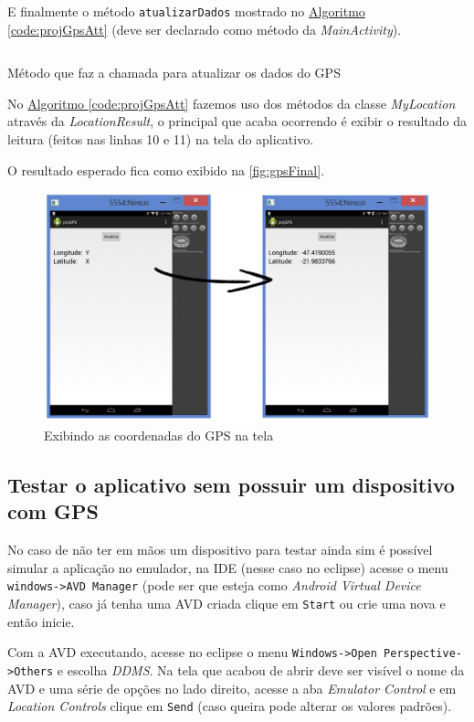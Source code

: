 \documentclass[a4paper,12pt,brazil,oneside]{book}
\begin{document}
		E finalmente o método \texttt{atualizarDados} mostrado no \hyperref[code:projGpsAtt]{Algoritmo \ref*{code:projGpsAtt}} (deve ser declarado como método da \emph{MainActivity}).
		
		\begin{listing}[H]
		\inputminted[linenos=true,fontsize=\small,frame=lines, framesep=2mm, tabsize=2,numbersep=5pt]{xml}{src/api/maps/atualizarDados.java}
		\caption{Método que faz a chamada para atualizar os dados do GPS}
		\label{code:projGpsAtt}
		\end{listing}
	
		No  \hyperref[code:projGpsAtt]{Algoritmo \ref*{code:projGpsAtt}}  fazemos uso dos métodos da classe \emph{MyLocation} através da \emph{LocationResult}, o principal que acaba ocorrendo é exibir o resultado da leitura (feitos nas linhas 10 e 11) na tela do aplicativo.
	
		O resultado esperado fica como exibido na \autoref{fig:gpsFinal}.
	
		\begin{figure}[H]
  \centering
  \includegraphics[width=.75\textwidth]{figuras/api/localizacao/GPS.png}
  \caption{Exibindo as coordenadas do GPS na tela}
  \label{fig:gpsFinal}
\end{figure}

		\subsection{Testar o aplicativo sem possuir um dispositivo com GPS}
		
		No caso de não ter em mãos um dispositivo para testar ainda sim é possível simular a aplicação no emulador, na IDE (nesse caso no eclipse) acesse o menu \texttt{windows->AVD Manager} (pode ser que esteja como \emph{Android Virtual Device Manager}), caso já tenha uma AVD criada clique em \texttt{Start} ou crie uma nova e então inicie.
		
		Com a AVD executando, acesse no eclipse o menu \texttt{Windows->Open Perspective->Others} e escolha \emph{DDMS}. Na tela que acabou de abrir deve ser visível o nome da AVD e uma série de opções no lado direito, acesse a aba \emph{Emulator Control} e em \emph{Location Controls} clique em \texttt{Send} (caso queira pode alterar os valores padrões).
		
\end{document}
